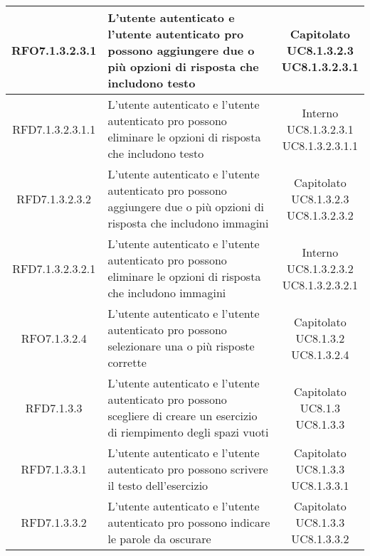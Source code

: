 \begin{longtable}{|c|>{\centering}m{7cm}|c|}
			 \hypertarget{{RFO7.1.3.2.3.1}}{{RFO7.1.3.2.3.1}} & L’utente autenticato e l'utente autenticato pro possono aggiungere due o più opzioni di risposta che includono testo & \makecell{Capitolato\\ UC8.1.3.2.3 \\UC8.1.3.2.3.1 } \\ \hline
			 \hypertarget{{RFD7.1.3.2.3.1.1}}{{RFD7.1.3.2.3.1.1}} & L’utente autenticato e l'utente autenticato pro possono eliminare le opzioni di risposta che includono testo & \makecell{Interno\\ UC8.1.3.2.3.1 \\UC8.1.3.2.3.1.1 } \\ \hline
			 \hypertarget{{RFD7.1.3.2.3.2}}{{RFD7.1.3.2.3.2}} & L’utente autenticato e l'utente autenticato pro possono aggiungere due o più opzioni di risposta che includono immagini & \makecell{Capitolato\\ UC8.1.3.2.3 \\UC8.1.3.2.3.2 } \\ \hline
			 \hypertarget{{RFD7.1.3.2.3.2.1}}{{RFD7.1.3.2.3.2.1}} & L’utente autenticato e l'utente autenticato pro possono eliminare le opzioni di risposta che includono immagini  & \makecell{Interno\\ UC8.1.3.2.3.2 \\UC8.1.3.2.3.2.1 } \\ \hline
			 \hypertarget{{RFO7.1.3.2.4}}{{RFO7.1.3.2.4}} & L’utente autenticato e l'utente autenticato pro possono selezionare una o più risposte corrette & \makecell{Capitolato\\ UC8.1.3.2 \\UC8.1.3.2.4 } \\ \hline
			 \hypertarget{{RFD7.1.3.3}}{{RFD7.1.3.3}} & L’utente autenticato e l’utente autenticato pro possono scegliere di creare un esercizio di riempimento degli spazi vuoti  & \makecell{Capitolato\\ UC8.1.3 \\UC8.1.3.3 } \\ \hline
			 \hypertarget{{RFD7.1.3.3.1}}{{RFD7.1.3.3.1}} & L’utente autenticato e l'utente autenticato pro possono scrivere il testo dell’esercizio & \makecell{Capitolato\\ UC8.1.3.3 \\UC8.1.3.3.1 } \\ \hline
			 \hypertarget{{RFD7.1.3.3.2}}{{RFD7.1.3.3.2}} & L’utente autenticato e l'utente autenticato pro possono indicare le parole da oscurare & \makecell{Capitolato\\ UC8.1.3.3 \\UC8.1.3.3.2 } \\ \hline

\end{longtable}
